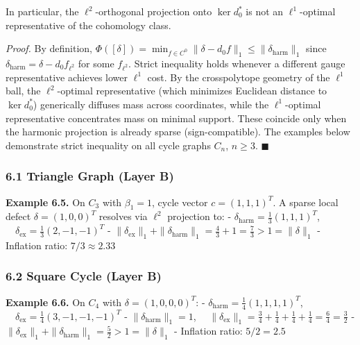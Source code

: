 \documentclass[
]{article}
\begin{document}
In particular, the \(\ell^2\)-orthogonal projection onto \(\ker d_0^*\)
is not an \(\ell^1\)-optimal representative of the cohomology class.

\emph{Proof.} By definition,
\(\Phi([\delta]) = \min_{f \in C^0} \|\delta - d_0 f\|_1 \leq \|\delta_{\mathrm{harm}}\|_1\)
since \(\delta_{\mathrm{harm}} = \delta - d_0 f_{\ell^2}\) for some
\(f_{\ell^2}\). Strict inequality holds whenever a different gauge
representative achieves lower \(\ell^1\) cost. By the crosspolytope
geometry of the \(\ell^1\) ball, the \(\ell^2\)-optimal representative
(which minimizes Euclidean distance to \(\ker d_0^*\)) generically
diffuses mass across coordinates, while the \(\ell^1\)-optimal
representative concentrates mass on minimal support. These coincide only
when the harmonic projection is already sparse (sign-compatible). The
examples below demonstrate strict inequality on all cycle graphs
\(C_n\), \(n \geq 3\). \(\blacksquare\)

\subsubsection{\texorpdfstring{6.1 Triangle Graph \textbf{(Layer
B)}}{6.1 Triangle Graph (Layer B)}}\label{triangle-graph-layer-b}

\textbf{Example 6.5.} On \(C_3\) with \(\beta_1 = 1\), cycle vector
\(c = (1,1,1)^T\). A sparse local defect \(\delta = (1,0,0)^T\) resolves
via \(\ell^2\) projection to: -
\(\delta_{\text{harm}} = \frac{1}{3}(1,1,1)^T\),
\(\quad \delta_{\text{ex}} = \frac{1}{3}(2,-1,-1)^T\) -
\(\|\delta_{\text{ex}}\|_1 + \|\delta_{\text{harm}}\|_1 = \frac{4}{3} + 1 = \frac{7}{3} > 1 = \|\delta\|_1\)
- Inflation ratio: \(7/3 \approx 2.33\)

\subsubsection{\texorpdfstring{6.2 Square Cycle \textbf{(Layer
B)}}{6.2 Square Cycle (Layer B)}}\label{square-cycle-layer-b}

\textbf{Example 6.6.} On \(C_4\) with \(\delta = (1,0,0,0)^T\): -
\(\delta_{\text{harm}} = \frac{1}{4}(1,1,1,1)^T\),
\(\quad \delta_{\text{ex}} = \frac{1}{4}(3,-1,-1,-1)^T\) -
\(\|\delta_{\text{harm}}\|_1 = 1\),
\(\quad \|\delta_{\text{ex}}\|_1 = \frac{3}{4} + \frac{1}{4} + \frac{1}{4} + \frac{1}{4} = \frac{6}{4} = \frac{3}{2}\)
-
\(\|\delta_{\text{ex}}\|_1 + \|\delta_{\text{harm}}\|_1 = \frac{5}{2} > 1 = \|\delta\|_1\)
- Inflation ratio: \(5/2 = 2.5\)
\end{document}
